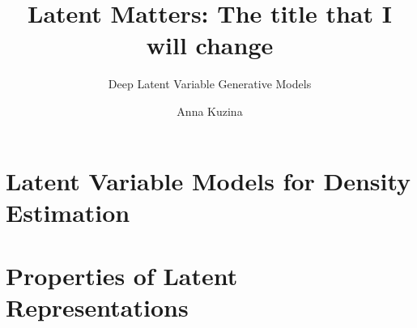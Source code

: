 \documentclass[nobib,justified,titlepage,nofonts,a4paper]{tufte-book}
\author[Anna Kuzina]{Anna Kuzina}
\title{Latent Matters: The title that I will change}
\subtitle{Deep Latent Variable Generative Models}
\begin{document}
\frontmatter
\maketitlepage
\pagestyle{plain}

% 
\tableofcontents


\mainmatter


% 

\listoftodos[Notes]

\part{Latent Variable Models for Density Estimation} \label{part:1}







\part{Properties of Latent Representations}\label{part:2}












\end{document}
